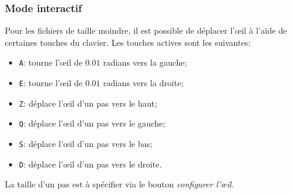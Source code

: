 \subsubsection*{Mode interactif}
Pour les fichiers de taille moindre, il est possible de déplacer
l'\oe{}il à l'aide de certaines touches du clavier. Les
touches actives sont les suivantes:
\begin{itemize}
\item \texttt{A}: tourne l'\oe{}il de $0.01$ radians vers la gauche;
\item \texttt{E}: tourne l'\oe{}il de $0.01$ radians vers la droite;
\item \texttt{Z}: déplace l'\oe{}il d'un pas vers le haut;
\item \texttt{Q}: déplace l'\oe{}il d'un pas vers le gauche;
\item \texttt{S}: déplace l'\oe{}il d'un pas vers le bas;
\item \texttt{D}: déplace l'\oe{}il d'un pas vers le droite.
\end{itemize}
La taille d'un pas est à spécifier via le bouton \emph{configurer l'\oe{}il}.

